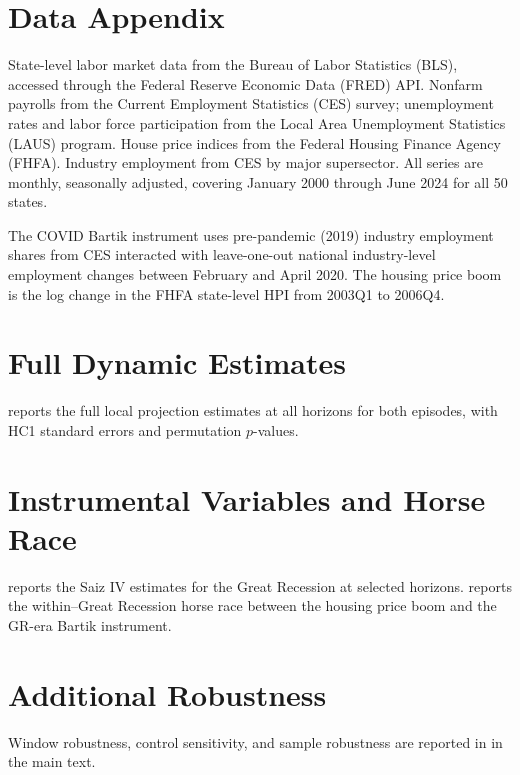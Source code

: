 \documentclass[12pt]{article}
\begin{document}
\section{Data Appendix}
\label{app:data}

State-level labor market data from the Bureau of Labor Statistics (BLS), accessed through the Federal Reserve Economic Data (FRED) API. Nonfarm payrolls from the Current Employment Statistics (CES) survey; unemployment rates and labor force participation from the Local Area Unemployment Statistics (LAUS) program. House price indices from the Federal Housing Finance Agency (FHFA). Industry employment from CES by major supersector. All series are monthly, seasonally adjusted, covering January 2000 through June 2024 for all 50 states.

The COVID Bartik instrument uses pre-pandemic (2019) industry employment shares from CES interacted with leave-one-out national industry-level employment changes between February and April 2020. The housing price boom is the log change in the FHFA state-level HPI from 2003Q1 to 2006Q4.

\section{Full Dynamic Estimates}
\label{app:dynamic}

 reports the full local projection estimates at all horizons for both episodes, with HC1 standard errors and permutation $p$-values.



\section{Instrumental Variables and Horse Race}
\label{app:iv}

 reports the Saiz IV estimates for the Great Recession at selected horizons.  reports the within--Great Recession horse race between the housing price boom and the GR-era Bartik instrument.





\section{Additional Robustness}
\label{app:robustness}

Window robustness, control sensitivity, and sample robustness are reported in  in the main text.


\end{document}

